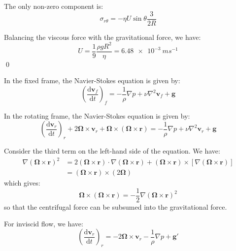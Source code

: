 \documentclass[12pt]{article}
\begin{document}
The only non-zero component is:
\begin{equation}
    \sigma_{r\theta} = - \eta U \sin{\theta} \frac{3}{2R}
\end{equation}

Balancing the viscous force with the gravitational force, we have:
\begin{equation}
    U = \frac{1}{9} \frac{\rho g R^{2}}{\eta} = \qty{6.48e-3}{ms^{-1}}
\end{equation}
\qed



In the fixed frame, the Navier-Stokes equation is given by:
\begin{equation}
    \left( \frac{\mathrm{d}\mathbf{v}_{f}}{\mathrm{d}t} \right)_{f} = -\frac{1}{\rho} \nabla p + \nu \nabla^{2} \mathbf{v}_{f} + \mathbf{g}
\end{equation}

In the rotating frame, the Navier-Stokes equation is given by:
\begin{equation}
    \left( \frac{\mathrm{d}\mathbf{v}_{r}}{\mathrm{d}t} \right)_{r} + 2\mathbf{\Omega} \times \mathbf{v}_{r} + \mathbf{\Omega} \times (\mathbf{\Omega} \times \mathbf{r}) = -\frac{1}{\rho} \nabla p + \nu \nabla^{2} \mathbf{v}_{r} + \mathbf{g}
\end{equation}

Consider the third term on the left-hand side of the equation. We have:
\begin{equation}
    \begin{split}
        \nabla (\mathbf{\Omega} \times \mathbf{r})^{2} &= 2 (\mathbf{\Omega} \times \mathbf{r}) \cdot \nabla (\mathbf{\Omega} \times \mathbf{r}) + (\mathbf{\Omega} \times \mathbf{r}) \times \left[ \nabla (\mathbf{\Omega} \times \mathbf{r}) \right] \\
        &= (\mathbf{\Omega} \times \mathbf{r}) \times (2\mathbf{\Omega})
    \end{split}
\end{equation}
which gives:
\begin{equation}
    \mathbf{\Omega} \times (\mathbf{\Omega} \times \mathbf{r}) = -\frac{1}{2} \nabla (\mathbf{\Omega} \times \mathbf{r})^{2}
\end{equation}
so that the centrifugal force can be subsumed into the gravitational force.

For inviscid flow, we have:
\begin{equation}
    \left( \frac{\mathrm{d}\mathbf{v}_{r}}{\mathrm{d}t} \right)_{r} = -2\mathbf{\Omega} \times \mathbf{v}_{r} - \frac{1}{\rho} \nabla p + \mathbf{g}'
\end{equation}
\end{document}
